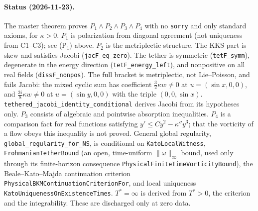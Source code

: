 \documentclass[11pt,a4paper]{article}
\theoremstyle{definition}
\begin{document}
\paragraph{Status (2026-11-23).} The master theorem proves $P_1\wedge P_2\wedge P_3\wedge P_4$ with no \texttt{sorry} and only standard axioms, for $\kappa>0$. $P_1$ is polarization from diagonal agreement (not uniqueness from C1--C3); see (P$_1$) above. $P_2$ is the metriplectic structure. The KKS part is skew and satisfies Jacobi (\texttt{jacF\_eq\_zero}). The tether is symmetric (\texttt{tetF\_symm}), degenerate in the energy direction (\texttt{tetF\_energy\_left}), and nonpositive on all real fields (\texttt{dissF\_nonpos}). The full bracket is metriplectic, not Lie--Poisson, and fails Jacobi: the mixed cyclic sum has coefficient $\tfrac32\kappa w\neq0$ at $u=(\sin x,0,0)$, and $\tfrac{3i}{8}\kappa w\neq0$ at $u=(\sin y,0,0)$ with the triple $(0,0,\sin x)$. \texttt{tethered\_jacobi\_identity\_conditional} derives Jacobi from its hypotheses only. $P_3$ consists of algebraic and pointwise absorption inequalities. $P_4$ is a comparison fact for real functions satisfying $y'\le Cy^2-\kappa''y^3$; that the vorticity of a flow obeys this inequality is not proved. General global regularity, \texttt{global\_regularity\_for\_NS}, is conditional on \texttt{KatoLocalWitness}, \texttt{FrohmanianTetherBound} (an open, time-uniform $\|\omega\|_\infty$ bound, used only through its finite-horizon consequence \texttt{PhysicalFiniteTimeVorticityBound}), the Beale--Kato--Majda continuation criterion \texttt{PhysicalBKMContinuationCriterionFor}, and local uniqueness \texttt{KatoUniquenessOnExistenceTimes}. $T^\ast=\infty$ is derived from $T^\ast>0$, the criterion and the integrability. These are discharged only at zero data.
\end{document}
